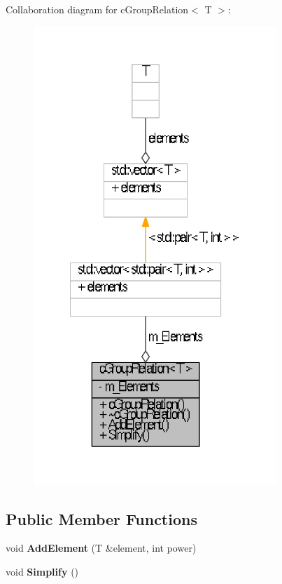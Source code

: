 \-Collaboration diagram for c\-Group\-Relation$<$ \-T $>$\-:\nopagebreak
\begin{figure}[H]
\begin{center}
\leavevmode
\includegraphics[width=260pt]{classcGroupRelation__coll__graph}
\end{center}
\end{figure}
\subsection*{\-Public \-Member \-Functions}
\begin{DoxyCompactItemize}
\item 
\hypertarget{classcGroupRelation_aeae9fe8f02b40a3cf1b7f73abee2b9cd}{void {\bfseries \-Add\-Element} (\-T \&element, int power)}\label{classcGroupRelation_aeae9fe8f02b40a3cf1b7f73abee2b9cd}

\item 
\hypertarget{classcGroupRelation_ac93e1c0794cbca8e574cbf1c4255c675}{void {\bfseries \-Simplify} ()}\label{classcGroupRelation_ac93e1c0794cbca8e574cbf1c4255c675}

\end{DoxyCompactItemize}
